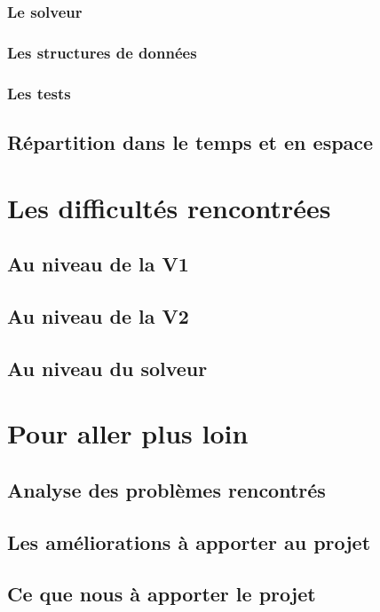 \documentclass{article}
\begin{document}
\subsubsection{Le solveur}
\subsubsection{Les structures de données}
\subsubsection{Les tests}

\subsection{Répartition dans le temps et en espace}

\section{Les difficultés rencontrées}
\subsection{Au niveau de la V1}
\subsection{Au niveau de la V2}
\subsection{Au niveau du solveur}

\section{Pour aller plus loin}
\subsection{Analyse des problèmes rencontrés}
\subsection{Les améliorations à apporter au projet}
\subsection{Ce que nous à apporter le projet}
\end{document}
